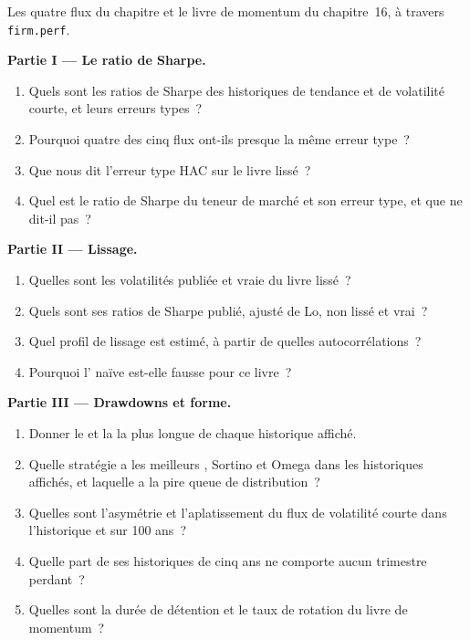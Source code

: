 \begin{problem}\label{pb:rs:performance-measurement:1}
Les quatre flux du chapitre et le livre de momentum du chapitre~16, à travers \texttt{firm.perf}.

\medskip\noindent\textbf{Partie I --- Le ratio de Sharpe.}
\begin{enumerate}
\item Quels sont les ratios de Sharpe des historiques de tendance et de volatilité courte, et leurs erreurs types~?
\item Pourquoi quatre des cinq flux ont-ils presque la même erreur type~?
\item Que nous dit l'erreur type HAC sur le livre lissé~?
\item Quel est le ratio de Sharpe du teneur de marché et son erreur type, et que ne dit-il pas~?
\end{enumerate}

\medskip\noindent\textbf{Partie II --- Lissage.}
\begin{enumerate}[resume]
\item Quelles sont les volatilités publiée et vraie du livre lissé~?
\item Quels sont ses ratios de Sharpe publié, ajusté de Lo, non lissé et vrai~?
\item Quel profil de lissage est estimé, à partir de quelles autocorrélations~?
\item Pourquoi l' naïve est-elle fausse pour ce livre~?
\end{enumerate}

\medskip\noindent\textbf{Partie III --- Drawdowns et forme.}
\begin{enumerate}[resume]
\item Donner le  et la  la plus longue de chaque historique affiché.
\item Quelle stratégie a les meilleurs , Sortino et Omega dans les historiques affichés, et laquelle a la pire queue de distribution~?
\item Quelles sont l'asymétrie et l'aplatissement du flux de volatilité courte dans l'historique et sur 100 ans~?
\item Quelle part de ses historiques de cinq ans ne comporte aucun trimestre perdant~?
\item Quelles sont la durée de détention et le taux de rotation du livre de momentum~?
\end{enumerate}


\end{problem}
